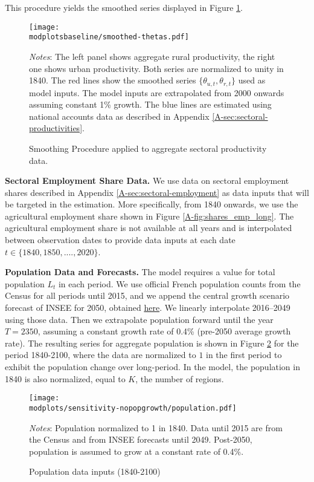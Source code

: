 \documentclass[11pt]{report}
\newcommand{\round}{revision3}  %
\newcommand{\modplotsbaseline}{../../output/model/plots/\round/baseline}
\newcommand{\modplots}{../../output/model/plots/\round}
\begin{document}
    This procedure yields the smoothed series displayed in Figure \ref{B-fig:smooththeta}.

\bigskip
\begin{figure}[h]
	\texttt{[image: \\modplotsbaseline/smoothed-thetas.pdf]}
	\caption{Smoothing Procedure applied to aggregate sectoral productivity data.\label{B-fig:smooththeta}}
		{\footnotesize \textit{Notes}: The left panel shows aggregate rural productivity, the right one shows urban productivity. Both series are normalized to unity in 1840. The red lines show the smoothed series $\{\theta_{u,t},\theta_{r,t}\}$ used as model inputs. The model inputs are extrapolated from 2000 onwards assuming constant 1\% growth. The blue lines are estimated using national accounts data as described in Appendix \ref{A-sec:sectoral-productivities}.}
\end{figure}


\textbf{Sectoral Employment Share Data.} We use data on sectoral employment shares described in Appendix \ref{A-sec:sectoral-employment} as data inputs that will be targeted in the estimation. More specifically, from 1840 onwards, we use the agricultural employment share shown in Figure \ref{A-fig:shares_emp_long}. The agricultural employment share is not available at all years and is interpolated between observation dates to provide data inputs at each date $t \in \{1840, 1850, ...., 2020\}$.

\textbf{Population Data and Forecasts.}\label{B-sec:input-demographics} The model requires a value for total population $L_t$ in each period. We use official French population counts from the Census for all periods until 2015, and we append the central growth scenario forecast of INSEE for 2050, obtained \href{https://www.insee.fr/fr/statistiques/2859843}{here}. We linearly interpolate 2016--2049 using those data. Then we extrapolate population forward until the year $T=2350$, assuming a constant growth rate of 0.4\% (pre-2050 average growth rate). The resulting series for aggregate population is shown in Figure \ref{B-fig:popdata} for the period 1840-2100, where the data are normalized to $1$ in the first period to exhibit the population change over long-period. In the model, the population in 1840 is also normalized, equal to $K$, the number of regions. 


\begin{figure}[h]
    \begin{center}
    \texttt{[image: \\modplots/sensitivity-nopopgrowth/population.pdf]}
    \caption{Population data inputs (1840-2100)\label{B-fig:popdata}}
    \end{center}
    {\footnotesize \textit{Notes}: Population normalized to 1 in 1840. Data until 2015 are from the Census and from INSEE forecasts until 2049. Post-2050, population is assumed to grow at a constant rate of 0.4\%.} 
\end{figure}
\end{document}
